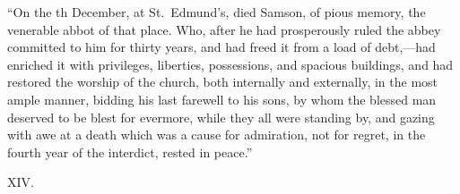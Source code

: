 \documentclass[10pt]{book}
\begin{document}
{``On the th December, at St.\ Edmund's, died Samson, of pious memory, the venerable abbot of that place. Who, after he had prosperously ruled the abbey committed to him for thirty years, and had freed it from a load of debt,---had enriched it with privileges, liberties, possessions, and spacious buildings, and had restored the worship of the church, both internally and externally, in the most ample manner, bidding his last farewell to his sons, by whom the blessed man deserved to be blest for evermore, while they all were standing by, and gazing with awe at a death which was a cause for admiration, not for regret, in the fourth year of the interdict, rested in peace.''

\vspace{.3cm}
\begin{center}
XIV.
\end{center}
}
\end{document}
